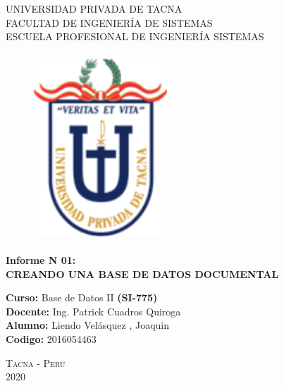 \documentclass[12pt,a4paper,oneside]{book}
\begin{document}
	
	\thispagestyle{empty} 
	
	\begin{center} 
		\LARGE{UNIVERSIDAD PRIVADA DE TACNA} \\[0.5cm] \Large{FACULTAD DE INGENIERÍA DE SISTEMAS}\\[0.5cm] \large{ ESCUELA PROFESIONAL DE INGENIERÍA SISTEMAS} 
	\end{center}
	
	\begin{figure}[htb]
		\centering \includegraphics[width=5cm, height=7cm]{img/uptlogo.png}
	\end{figure}
	
	\begin{center} \LARGE{\bf Informe N 01:}\\ \vspace{.25cm} { 
			\Large \bfseries {CREANDO UNA BASE DE DATOS DOCUMENTAL}}\\ 
		
	\end{center}
	
	\large{\bf Curso: } Base de Datos II
	\textbf{(SI-775)}\\
	\large{\bf Docente: } Ing. Patrick Cuadros Quiroga\\
	\large{\bf Alumno: } Liendo Velásquez , Joaquin\\
	\large{\bf Codigo: } 2016054463\\
	
	
	
	\begin{center} 
		\Large \textsc{Tacna - Perú} \\
		\Large \textsc{2020 } 
	\end{center}
\end{document}
